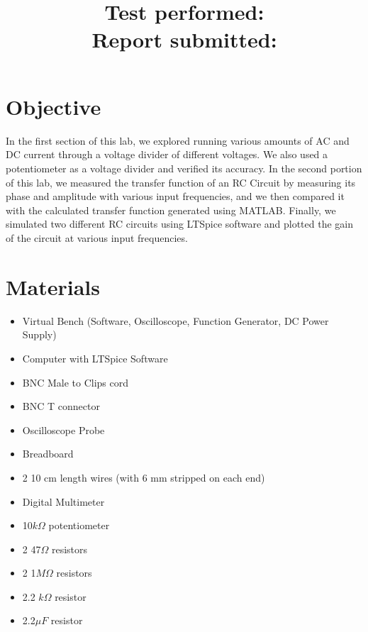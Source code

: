\documentclass[10pt]{article}
\title{
    \textbf{\courseTitle} \\
    \textbf{\documentTitle} \\
    \bigskip
    \textbf{\large{Test performed: \testDate}} \\
    \textbf{\large{Report submitted: \reportDate}} \\
    \bigskip
    \bigskip
}
\author{\documentAuthor}
\date{}
\begin{document}
\maketitle

\newpage

\section{Objective}

In the first section of this lab, we explored running various amounts of AC and DC current through a voltage divider of different voltages. We also used a potentiometer as a voltage divider and verified its accuracy. In the second portion of this lab, we measured the transfer function of an RC Circuit by measuring its phase and amplitude with various input frequencies, and we then compared it with the calculated transfer function generated using MATLAB. Finally, we simulated two different RC circuits using LTSpice software and plotted the gain of the circuit at various input frequencies. 



\section{Materials}

\begin{itemize}
	\item Virtual Bench (Software, Oscilloscope, Function Generator, DC Power Supply)
	\item Computer with LTSpice Software 
	\item BNC Male to Clips cord
	\item BNC T connector
	\item Oscilloscope Probe
	\item Breadboard
	\item 2 10 cm length wires (with 6 mm stripped on each end)
	\item Digital Multimeter
	\item 10$k\Omega$ potentiometer
	\item 2 47$\Omega$ resistors
	\item 2 1$M\Omega$ resistors
	\item 2.2 $k\Omega$ resistor
	\item 2.2$\mu F$ resistor
	
\end{itemize}
\end{document}
